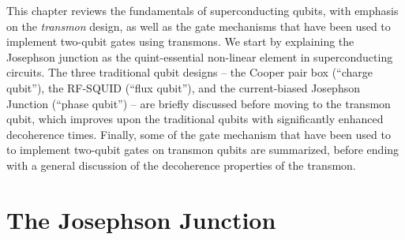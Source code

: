 This chapter reviews the fundamentals of superconducting qubits, with emphasis
on the \emph{transmon} design, as well as the gate mechanisms that have been
used to implement two-qubit gates using transmons. We start by explaining the
Josephson junction as the quint-essential non-linear element in
superconducting circuits. The three traditional qubit designs -- the Cooper pair
box (``charge qubit''), the RF-SQUID (``flux qubit''), and the current-biased
Josephson Junction (``phase qubit'') -- are briefly discussed before moving to
the transmon qubit, which improves upon the traditional qubits with
significantly enhanced decoherence times. Finally, some of the gate mechanism
that have been used to to implement two-qubit gates on transmon qubits are
summarized, before ending with a general discussion of the decoherence
properties of the transmon.


\section{The Josephson Junction}
\label{sec:jj}

